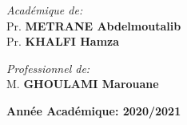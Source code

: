 \begin{titlepage}
\begin{minipage}{0.4\textwidth}
 \begin{flushleft}
 	\centering
    \emph{Académique de:} \\[0.5cm]
    Pr. \textbf{\textsc{METRANE} Abdelmoutalib}\\
	Pr. \textbf{\textsc{KHALFI} Hamza}\\
 \end{flushleft}
\end{minipage}\hfill
\noindent
\begin{minipage}{0.4\textwidth}
 \begin{flushright}
 	\centering
    \emph{Professionnel de:} \\[0.5cm]
     M. \textbf{\textsc{GHOULAMI} Marouane}\\
  \end{flushright}
\end{minipage}
\vfill
\centering



\vfill
{\large \textbf{Année Académique: 2020/2021}}

\end{titlepage}
